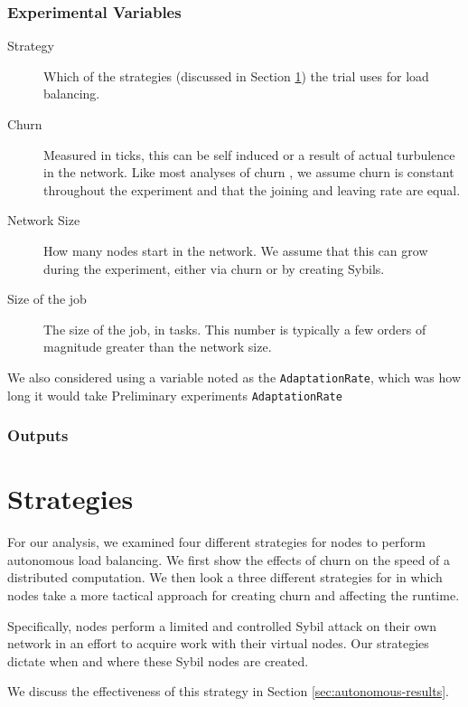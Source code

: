 \subsubsection{Experimental Variables}
\begin{description}
	\item [Strategy] Which of the strategies (discussed in Section \ref{sec:strategies}) the trial uses for load balancing.
	\item [Churn] Measured in ticks, this can be self induced or a result of actual turbulence in the network.
	Like most analyses of churn \cite{marozzo2012p2p}, we assume churn is constant throughout the experiment and that the joining and leaving rate are equal.
	\item [Network Size]  How many nodes start in the network.  
		We assume that this can grow during the experiment, either via churn or by creating Sybils.
	\item [Size of the job] The size of the job, in tasks.
		This number is typically a few orders of magnitude greater than the network size.
\end{description}

We also considered using a variable noted as the \texttt{AdaptationRate}, which was how long it would take
Preliminary experiments \texttt{AdaptationRate} 

\subsubsection{Outputs}



\section{Strategies}
\label{sec:strategies}

For our analysis, we examined four different strategies for nodes to perform autonomous load balancing.
We first show the effects of churn on the speed of a distributed computation.
We then look a three different strategies for in which nodes take a more tactical approach for creating churn and affecting the runtime.

Specifically, nodes perform a limited and controlled Sybil attack \cite{sybil} on their own network in an effort to acquire work with their virtual nodes.
Our strategies dictate when and where these Sybil nodes are created.

We discuss the effectiveness of this strategy in Section \ref{sec:autonomous-results}.



